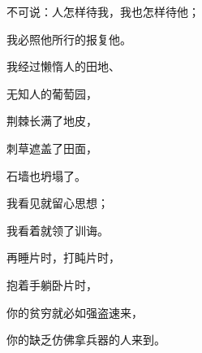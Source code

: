 {\par }{\Q {}不可说：人怎样待我，我也怎样待他；
\par }{\Q 我必照他所行的报复他。
\par }{\BB \par }{\Q {}我经过懒惰人的田地、
\par }{\Q 无知人的葡萄园，
\par }{\Q {}荆棘长满了地皮，
\par }{\Q 刺草遮盖了田面，
\par }{\Q 石墙也坍塌了。
\par }{\Q {}我看见就留心思想；
\par }{\Q 我看着就领了训诲。
\par }{\Q {}再睡片时，打盹片时，
\par }{\Q 抱着手躺卧片时，
\par }{\Q {}你的贫穷就必如强盗速来，
\par }{\Q 你的缺乏仿佛拿兵器的人来到。

}
